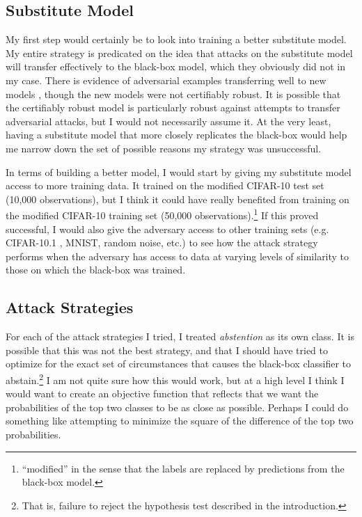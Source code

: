 \documentclass{article}
\begin{document}
\subsection{Substitute Model}
My first step would certainly be to look into training a better substitute model. My entire strategy is predicated on the idea that attacks on the substitute model will transfer effectively to the black-box model, which they obviously did not in my case. There is evidence of adversarial examples transferring well to new models \cite{PMG16}, though the new models were not certifiably robust. It is possible that the certifiably robust model is particularly robust against attempts to transfer adversarial attacks, but I would not necessarily assume it. At the very least, having a substitute model that more closely replicates the black-box would help me narrow down the set of possible reasons my strategy was unsuccessful. \newline

In terms of building a better model, I would start by giving my substitute model access to more training data.  It trained on the modified CIFAR-10 test set (10,000 observations), but I think it could have really benefited from training on the modified CIFAR-10 training set (50,000 observations).\footnote{``modified'' in the sense that the labels are replaced by predictions from the black-box model.} If this proved successful, I would also give the adversary access to other training sets (e.g. CIFAR-10.1 \cite{RRSS18} \cite{TFF08}, MNIST, random noise, etc.) to see how the attack strategy performs when the adversary has access to data at varying levels of similarity to those on which the black-box was trained.

\subsection{Attack Strategies}
For each of the attack strategies I tried, I treated \textit{abstention} as its own class. It is possible that this was not the best strategy, and that I should have tried to optimize for the exact set of circumstances that causes the black-box classifier to abstain.\footnote{That is, failure to reject the hypothesis test described in the introduction.} I am not quite sure how this would work, but at a high level I think I would want to create an objective function that reflects that we want the probabilities of the top two classes to be as close as possible. Perhaps I could do something like attempting to minimize the square of the difference of the top two probabilities.
\end{document}
